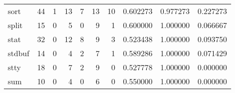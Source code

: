 \begin{tabular}{lrrrrrrrrr}
sort      &                                       44 &                                                  1 &                                                 13 &                                                  7 &                                                 13 &                                                 10 &                                           0.602273 &                               0.977273 &                             0.227273 \\
split     &                                       15 &                                                  0 &                                                  5 &                                                  0 &                                                  9 &                                                  1 &                                           0.600000 &                               1.000000 &                             0.066667 \\
stat      &                                       32 &                                                  0 &                                                 12 &                                                  8 &                                                  9 &                                                  3 &                                           0.523438 &                               1.000000 &                             0.093750 \\
stdbuf    &                                       14 &                                                  0 &                                                  4 &                                                  2 &                                                  7 &                                                  1 &                                           0.589286 &                               1.000000 &                             0.071429 \\
stty      &                                       18 &                                                  0 &                                                  7 &                                                  2 &                                                  9 &                                                  0 &                                           0.527778 &                               1.000000 &                             0.000000 \\
sum       &                                       10 &                                                  0 &                                                  4 &                                                  0 &                                                  6 &                                                  0 &                                           0.550000 &                               1.000000 &                             0.000000 \\

\end{tabular}
